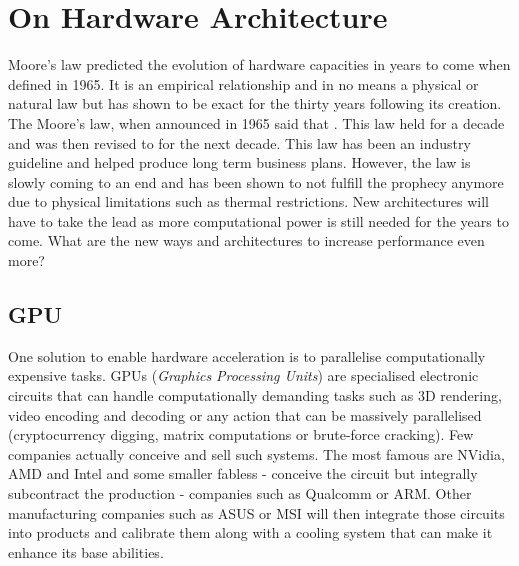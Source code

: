 
\section{On Hardware Architecture}

Moore's law \cite{Moore2006} predicted the evolution of hardware capacities in years to come when defined in 1965. It is an empirical relationship and in no means a physical or natural law but has shown to be exact for the thirty years following its creation. The Moore's law, when announced in 1965 said that . This law held for a decade and was then revised to  for the next decade. This law has been an industry guideline and helped produce long term business plans. However, the law is slowly coming to an end and has been shown to not fulfill the prophecy anymore due to physical limitations such as thermal restrictions. New architectures will have to take the lead as more computational power is still needed for the years to come. What are the new ways and architectures to increase performance even more?


\subsection{GPU}

One solution to enable hardware acceleration is to parallelise computationally expensive tasks. GPUs (\emph{Graphics Processing Units}) are specialised electronic circuits that can handle computationally demanding tasks such as 3D rendering, video encoding and decoding or any action that can be massively parallelised (cryptocurrency digging, matrix computations or brute-force cracking). Few companies actually conceive and sell such systems. The most famous are NVidia, AMD and Intel and some smaller fabless - conceive the circuit but integrally subcontract the production -  companies such as Qualcomm or ARM. Other manufacturing companies such as ASUS or MSI will then integrate those circuits into products and calibrate them along with a cooling system that can make it enhance its base abilities.

